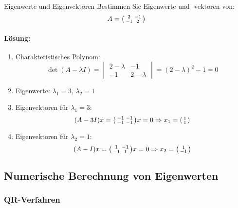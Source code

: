 \begin{example2}{Eigenwerte und Eigenvektoren}
Bestimmen Sie Eigenwerte und -vektoren von:
$$A = \begin{psmallmatrix}
2 & -1 \\
-1 & 2
\end{psmallmatrix}$$

\paragraph{Lösung:}
\begin{enumerate}
    \item Charakteristisches Polynom:
    $$\det(A-\lambda I) = \begin{vmatrix} 
    2-\lambda & -1 \\
    -1 & 2-\lambda
    \end{vmatrix} = (2-\lambda)^2 - 1 = 0$$
    
    \item Eigenwerte: $\lambda_1 = 3$, $\lambda_2 = 1$
    
    \item Eigenvektoren für $\lambda_1 = 3$:
    $$(A-3I)x = \begin{psmallmatrix}
    -1 & -1 \\
    -1 & -1
    \end{psmallmatrix}x = 0 \Rightarrow x_1 = \begin{psmallmatrix}
    1 \\
    1
    \end{psmallmatrix}$$
    
    \item Eigenvektoren für $\lambda_2 = 1$:
    $$(A-I)x = \begin{psmallmatrix}
    1 & -1 \\
    -1 & 1
    \end{psmallmatrix}x = 0 \Rightarrow x_2 = \begin{psmallmatrix}
    1 \\
    -1
    \end{psmallmatrix}$$
\end{enumerate}
\end{example2}

\columnbreak

\subsection{Numerische Berechnung von Eigenwerten}

\subsubsection{QR-Verfahren}

